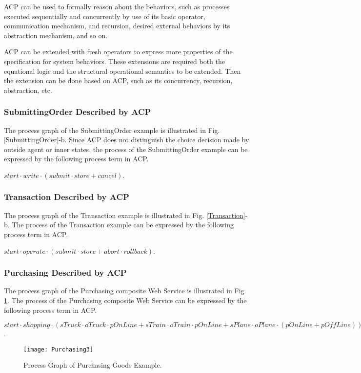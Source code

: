 \documentclass{fac}
\begin{document}
ACP can be used to formally reason about the behaviors, such as processes executed sequentially and concurrently by use of its basic operator, communication mechanism, and recursion, desired external behaviors by its abstraction mechanism, and so on.

ACP can be extended with fresh operators to express more properties of the specification for system behaviors. These extensions are required both the equational logic and the structural operational semantics to be extended. Then the extension can be done based on ACP, such as its concurrency, recursion, abstraction, etc.

\subsubsection{SubmittingOrder Described by ACP}

The process graph of the SubmittingOrder example is illustrated in Fig. \ref{SubmittingOrder}-b. Since ACP does not distinguish the choice decision made by outside agent or inner states, the process of the SubmittingOrder example can be expressed by the following process term in ACP.

$start\cdot write\cdot (submit\cdot store + cancel)$.

\subsubsection{Transaction Described by ACP}

The process graph of the Transaction example is illustrated in Fig. \ref{Transaction}-b. The process of the Transaction example can be expressed by the following process term in ACP.

$start\cdot operate\cdot (submit\cdot store + abort\cdot rollback)$.

\subsubsection{Purchasing Described by ACP}

The process graph of the Purchasing composite Web Service is illustrated in Fig. \ref{Purchasing3}. The process of the Purchasing composite Web Service can be expressed by the following process term in ACP.

$start\cdot shopping\cdot (sTruck\cdot oTruck\cdot pOnLine + sTrain\cdot oTrain\cdot pOnLine + sPlane \cdot oPlane \cdot (pOnLine + pOffLine))$.

\begin{figure}
  \centering
\texttt{[image: Purchasing3]}
  \caption{Process Graph of Purchasing Goods Example.}
  \label{Purchasing3}
\end{figure}
\end{document}
